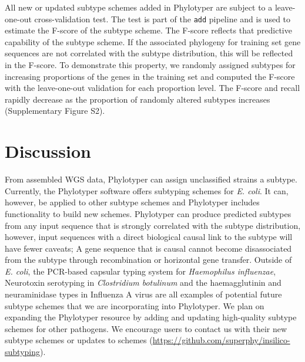 \documentclass{bioinfo}
\begin{document}
All new or updated subtype schemes added in Phylotyper are subject to a leave-one-out cross-validation test.
The test is part of the \texttt{add} pipeline and is used to estimate the F-score of the subtype scheme. 
The F-score reflects that predictive capability of the subtype scheme. 
If the associated phylogeny for training set gene sequences are not correlated with the subtype distribution, this will be reflected in the F-score. 
To demonstrate this property, we randomly assigned subtypes for increasing proportions of the genes in the training set and computed the F-score with the leave-one-out validation for each proportion level.
The F-score and recall rapidly decrease as the proportion of randomly altered subtypes increases (Supplementary Figure S2).

\section{Discussion}

From assembled WGS data, Phylotyper can assign unclassified strains a subtype.
Currently, the Phylotyper software offers subtyping schemes for \textit{E. coli}.
It can, however, be applied to other subtype schemes and Phylotyper includes functionality to build new schemes.
Phylotyper can produce predicted subtypes from any input sequence that is strongly correlated with the subtype distribution, however, input sequences with a direct biological causal link to the subtype will have fewer caveats; A gene sequence that is causal cannot become disassociated from the subtype through recombination or horizontal gene transfer.
Outside of \textit{E. coli}, the PCR-based capsular typing system for \textit{Haemophilus influenzae}, Neurotoxin serotyping in \textit{Clostridium botulinum} and the haemagglutinin and neuraminidase types in Influenza A virus are all examples of potential future subtype schemes that we are incorporating into Phylotyper.
We plan on expanding the Phylotyper resource by adding and updating high-quality subtype schemes for other pathogens.
We encourage users to contact us with their new subtype schemes or updates to schemes (\url{https://github.com/superphy/insilico-subtyping}).
\end{document}
